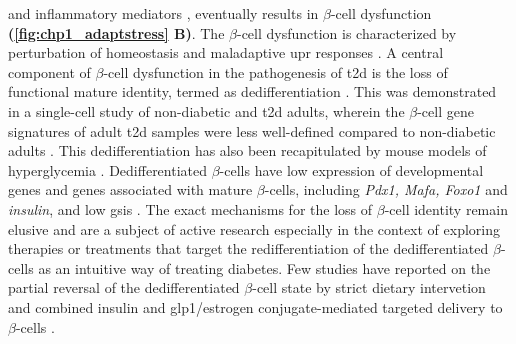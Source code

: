and inflammatory mediators \textbf{\cite{eizirik_pancreatic_2020,cosentino_crosstalk_2021}}, eventually results in $\beta$-cell dysfunction \textbf{(\autoref{fig:chp1_adaptstress} B)}. The $\beta$-cell dysfunction is characterized by perturbation of  homeostasis and maladaptive \gls{upr} responses \textbf{\cite{kalwat_pancreatic_2021}}. A central component of $\beta$-cell dysfunction in the pathogenesis of \gls{t2d} is the loss of functional mature identity, termed as dedifferentiation \textbf{\cite{miranda_pancreatic_2021}}. This was demonstrated in a single-cell study of non-diabetic and \gls{t2d} adults, wherein the $\beta$-cell gene signatures of adult \gls{t2d} samples were less well-defined compared to non-diabetic adults \textbf{\cite{wang_single-cell_2016}}. This dedifferentiation has also been recapitulated by mouse models of hyperglycemia \textbf{\cite{sachs_targeted_2020,oppenlander_vertical_2021}}. Dedifferentiated $\beta$-cells have low expression of developmental genes and genes associated with mature $\beta$-cells, including \textit{Pdx1, Mafa, Foxo1} and \textit{insulin}, and low \gls{gsis} \textbf{\cite{miranda_pancreatic_2021}}. The exact mechanisms for the loss of $\beta$-cell identity remain elusive and are a subject of active research especially in the context of exploring therapies or treatments that target the redifferentiation of the dedifferentiated $\beta$-cells as an intuitive way of treating diabetes. Few studies have reported on the partial reversal of the dedifferentiated $\beta$-cell state by strict dietary intervetion \textbf{\cite{sheng_reversibility_2016,ishida_pair_2017}} and combined insulin and \gls{glp1}/estrogen conjugate-mediated targeted delivery to $\beta$-cells \textbf{\cite{sachs_targeted_2020,oppenlander_vertical_2021}}.\\






